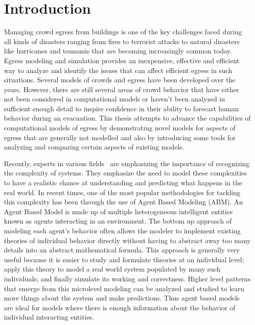 
\chapter{Introduction}
\label{chapter:Introduction}

Managing crowd egress from buildings is one of the key challenges faced during all kinds of disasters ranging from fires to terrorist attacks to natural disasters like hurricanes and tsunamis that are becoming increasingly common today. Egress modeling and simulation provides an inexpensive, effective and efficient way to analyze and identify the issues that can affect efficient egress in such situations. Several models of crowds and egress have been developed over the years. However, there are still several areas of crowd behavior that have either not been considered in computational models or haven't been analyzed in sufficient enough detail to inspire confidence in their ability to forecast human behavior during an evacuation. This thesis attempts to advance the capabilities of computational models of egress by demonstrating novel models for aspects of egress that are generally not modelled and also by introducing some tools for analyzing and comparing certain aspects of existing models.




Recently, experts in various fields~\cite{Arthur:2010uy} are emphasizing the importance of recognizing the complexity of systems. They emphasize the need to model these complexities to have a realistic chance at understanding and predicting what happens in the real world. In recent times, one of the most popular methodologies for tackling this complexity has been through the use of Agent Based Modeling (ABM). An Agent Based Model is made up of multiple heterogeneous intelligent entities known as agents interacting in an environment. The bottom up approach of modeling each agent's behavior often allows the modeler to implement existing theories of individual behavior directly without having to abstract away too many details into an abstract mathematical formula. This approach is generally very useful because it is easier to study and formulate theories at an individual level; apply this theory to model a real world system populated by many such individuals; and finally simulate its working and correctness. Higher level patterns that emerge from this microlevel modeling can be analyzed and studied to learn more things about the system and make predictions. Thus agent based models are ideal for models where there is enough information about the behavior of individual interacting entities.

